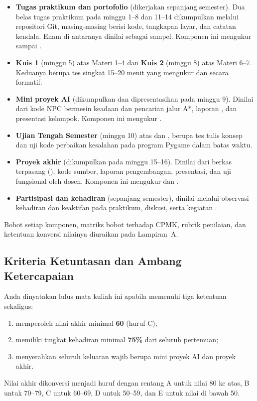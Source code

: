 \begin{itemize}
  \item \textbf{Tugas praktikum dan portofolio} (dikerjakan sepanjang
        semester). Dua belas tugas praktikum pada minggu 1--8 dan 11--14
        dikumpulkan melalui repositori Git, masing-masing berisi kode,
        tangkapan layar, dan catatan kendala. Enam di antaranya dinilai sebagai
        sampel. Komponen ini mengukur  sampai .
  \item \textbf{Kuis 1} (minggu 5) atas Materi 1--4 dan \textbf{Kuis 2}
        (minggu 8) atas Materi 6--7. Keduanya berupa tes singkat 15--20 menit
        yang mengukur  dan  secara formatif.
  \item \textbf{Mini proyek AI} (dikumpulkan dan dipresentasikan pada minggu
        9). Dinilai dari kode NPC bermesin keadaan dan pencarian jalur A*,
        laporan , dan presentasi kelompok. Komponen ini
        mengukur .
  \item \textbf{Ujian Tengah Semester} (minggu 10) atas  dan
        , berupa tes tulis konsep dan uji kode perbaikan kesalahan pada
        program Pygame dalam batas waktu.
  \item \textbf{Proyek akhir} (dikumpulkan pada minggu 15--16). Dinilai dari
        berkas terpasang (), kode sumber, laporan pengembangan,
        presentasi, dan uji fungsional oleh dosen. Komponen ini mengukur
         dan .
  \item \textbf{Partisipasi dan kehadiran} (sepanjang semester), dinilai
        melalui observasi kehadiran dan keaktifan pada praktikum, diskusi,
        serta kegiatan .
\end{itemize}

Bobot setiap komponen, matriks bobot terhadap CPMK, rubrik penilaian, dan
ketentuan konversi nilainya diuraikan pada Lampiran~A.

\subsection{Kriteria Ketuntasan dan Ambang Ketercapaian}

Anda dinyatakan lulus mata kuliah ini apabila memenuhi tiga ketentuan
sekaligus:
\begin{enumerate}
  \item memperoleh nilai akhir minimal \textbf{60} (huruf C);
  \item memiliki tingkat kehadiran minimal \textbf{75\%} dari seluruh
        pertemuan;
  \item menyerahkan seluruh keluaran wajib berupa mini proyek AI dan proyek
        akhir.
\end{enumerate}
Nilai akhir dikonversi menjadi huruf dengan rentang A untuk nilai 80 ke atas,
B untuk 70--79, C untuk 60--69, D untuk 50--59, dan E untuk nilai di bawah 50.

